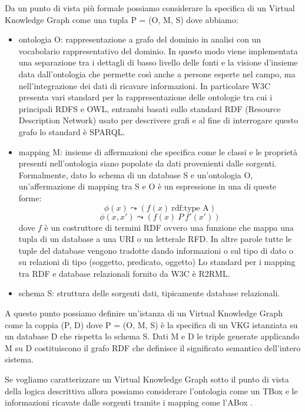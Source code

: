 Da un punto di vista più formale possiamo considerare la specifica di un Virtual Knowledge Graph come una tupla P = (O, M, S) dove abbiamo:
\begin{itemize}
    \item ontologia O: rappresentazione a grafo del dominio in analisi con un vocabolario rappresentativo del dominio. 
        In questo modo viene implementata una separazione tra i dettagli di basso livello delle fonti e la visione d'insieme data dall'ontologia che permette così anche a persone esperte nel campo, ma nell'integrazione 
        dei dati di ricavare informazioni. 
        In particolare W3C presenta vari standard per la rappresentazione delle ontologie tra cui i principali RDFS e OWL, entrambi basati sullo standard RDF (Resource Description Network) usato per descrivere grafi e al 
        fine di interrogare questo grafo lo standard è SPARQL.
    \item mapping M: insieme di affermazioni che specifica come le classi e le proprietà presenti nell'ontologia siano popolate da dati provenienti dalle sorgenti. Formalmente, dato lo schema di un database S e 
        un'ontologia O, un'affermazione di mapping tra S e O è un espressione in una di queste forme:
        \[ \phi(x) \leadsto (f(x) \ \textrm{rdf:type A}) \]
        \[\phi(x, x') \leadsto (f(x) \ P \ f'(x'))\] 
        dove $f$ è un costruttore di termini RDF ovvero una funzione che mappa una tupla di un database a una URI o un letterale RFD.
        In altre parole tutte le tuple del database vengono tradotte dando informazioni o sul tipo di dato o su relazioni di tipo (soggetto, predicato, oggetto)
        Lo standard per i mapping tra RDF e database relazionali fornito da W3C è R2RML.
    \item schema S: struttura delle sorgenti dati, tipicamente database relazionali.
\end{itemize}

A questo punto possiamo definire un'istanza di un Virtual Knowledge Graph come la coppia (P, D) dove P = (O, M, S) è la specifica di un VKG istanziata su un database D che rispetta lo schema S.
Dati M e D le triple generate applicando M su D costituiscono il grafo RDF che definisce il significato semantico dell'intero sistema.

Se vogliamo caratterizzare un Virtual Knowledge Graph sotto il punto di vista della logica descrittiva allora possiamo considerare l'ontologia come un TBox e le informazioni ricavate dalle sorgenti 
tramite i mapping come l'ABox \cite{OBDA} \cite{VKGOverview}. 


